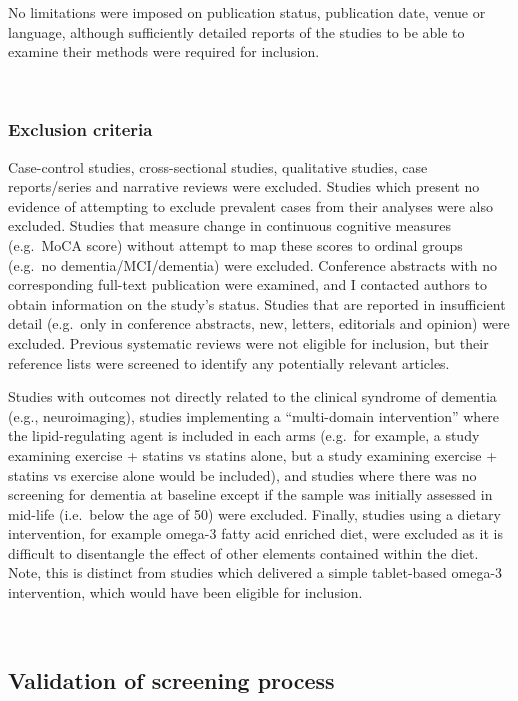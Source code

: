 \documentclass[a4paper, twoside]{templates/ociamthesis}
\begin{document}
No limitations were imposed on publication status, publication date, venue or language, although sufficiently detailed reports of the studies to be able to examine their methods were required for inclusion.

~

\hypertarget{exclusion-criteria}{%
\subsubsection{Exclusion criteria}\label{exclusion-criteria}}

Case-control studies, cross-sectional studies, qualitative studies, case reports/series and narrative reviews were excluded. Studies which present no evidence of attempting to exclude prevalent cases from their analyses were also excluded. Studies that measure change in continuous cognitive measures (e.g.~MoCA score) without attempt to map these scores to ordinal groups (e.g.~no dementia/MCI/dementia) were excluded. Conference abstracts with no corresponding full-text publication were examined, and I contacted authors to obtain information on the study's status. Studies that are reported in insufficient detail (e.g.~only in conference abstracts, new, letters, editorials and opinion) were excluded. Previous systematic reviews were not eligible for inclusion, but their reference lists were screened to identify any potentially relevant articles.

Studies with outcomes not directly related to the clinical syndrome of dementia (e.g., neuroimaging), studies implementing a ``multi-domain intervention'' where the lipid-regulating agent is included in each arms (e.g.~for example, a study examining exercise + statins vs statins alone, but a study examining exercise + statins vs exercise alone would be included), and studies where there was no screening for dementia at baseline except if the sample was initially assessed in mid-life (i.e.~below the age of 50) were excluded. Finally, studies using a dietary intervention, for example omega-3 fatty acid enriched diet, were excluded as it is difficult to disentangle the effect of other elements contained within the diet. Note, this is distinct from studies which delivered a simple tablet-based omega-3 intervention, which would have been eligible for inclusion.

~

\hypertarget{validation-of-screening-process}{%
\subsection{Validation of screening process}\label{validation-of-screening-process}}
\end{document}
